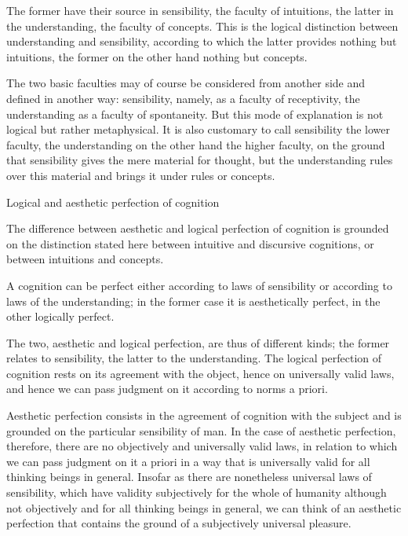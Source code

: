     The former have their source in sensibility, the faculty of intuitions,
    the latter in the understanding, the faculty of concepts.
    This is the logical distinction between understanding and sensibility,
    according to which the latter provides nothing but intuitions,
    the former on the other hand nothing but concepts.

        The two basic faculties may of course be considered
        from another side and defined in another way:
        sensibility, namely, as a faculty of receptivity,
        the understanding as a faculty of spontaneity.
        But this mode of explanation is not logical but rather metaphysical.
        It is also customary to call sensibility the lower faculty,
        the understanding on the other hand the higher faculty,
        on the ground that sensibility gives the mere material for thought,
        but the understanding rules over this material
        and brings it under rules or concepts.

    Logical and aesthetic perfection of cognition

    The difference between aesthetic and logical
    perfection of cognition
    is grounded on the distinction stated here
    between intuitive and discursive cognitions, or
    between intuitions and concepts.

    A cognition can be perfect either
    according to laws of sensibility or
    according to laws of the understanding;
    in the former case it is aesthetically perfect,
    in the other logically perfect.

    The two, aesthetic and logical perfection,
    are thus of different kinds;
    the former relates to sensibility,
    the latter to the understanding.
    The logical perfection of cognition rests on
    its agreement with the object,
    hence on universally valid laws,
    and hence we can pass judgment on it
    according to norms a priori.

    Aesthetic perfection consists in
    the agreement of cognition with the subject
    and is grounded on the particular sensibility of man.
    In the case of aesthetic perfection, therefore,
    there are no objectively and universally valid laws,
    in relation to which we can pass judgment on it a priori
    in a way that is universally valid for all thinking beings in general.
    Insofar as there are nonetheless universal laws of sensibility,
    which have validity subjectively for the whole of humanity
    although not objectively and for all thinking beings in general,
    we can think of an aesthetic perfection that contains
    the ground of a subjectively universal pleasure.

